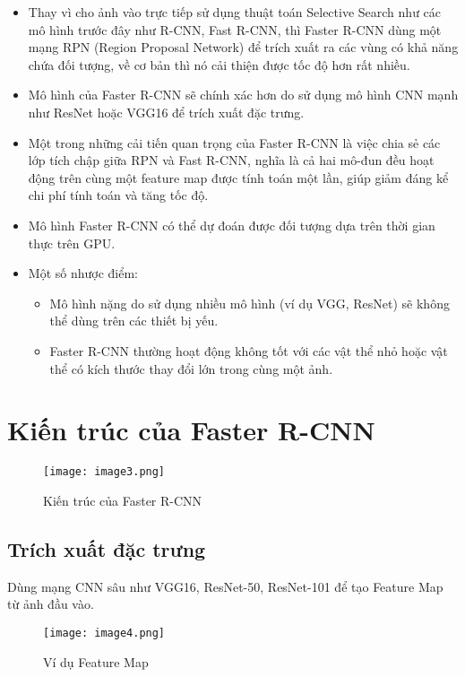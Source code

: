 \documentclass{article}
\begin{document}
\begin{itemize}
    \item Thay vì cho ảnh vào trực tiếp sử dụng thuật toán Selective Search như các mô hình trước đây như R-CNN, Fast R-CNN, thì Faster R-CNN dùng một mạng RPN (Region Proposal Network) để trích xuất ra các vùng có khả năng chứa đối tượng, về cơ bản thì nó cải thiện được tốc độ hơn rất nhiều.
    \item Mô hình của Faster R-CNN sẽ chính xác hơn do sử dụng mô hình CNN mạnh như ResNet hoặc VGG16 để trích xuất đặc trưng.
    \item Một trong những cải tiến quan trọng của Faster R-CNN là việc chia sẻ các lớp tích chập giữa RPN và Fast R-CNN, nghĩa là cả hai mô-đun đều hoạt động trên cùng một feature map được tính toán một lần, giúp giảm đáng kể chi phí tính toán và tăng tốc độ.
    \item Mô hình Faster R-CNN có thể dự đoán được đối tượng dựa trên thời gian thực trên GPU.
    \item Một số nhược điểm:
    \begin{itemize}
        \item Mô hình nặng do sử dụng nhiều mô hình (ví dụ VGG, ResNet) sẽ không thể dùng trên các thiết bị yếu.
        \item Faster R-CNN thường hoạt động không tốt với các vật thể nhỏ hoặc vật thể có kích thước thay đổi lớn trong cùng một ảnh.
    \end{itemize}
\end{itemize}

\section{Kiến trúc của Faster R-CNN}
\begin{figure}[H]
    \centering
    \texttt{[image: image3.png]}
    \caption{Kiến trúc của Faster R-CNN}
\end{figure}

\subsection{Trích xuất đặc trưng}
Dùng mạng CNN sâu như VGG16, ResNet-50, ResNet-101 để tạo Feature Map từ ảnh đầu vào.

\begin{figure}[H]
    \centering
    \texttt{[image: image4.png]}
    \caption{Ví dụ Feature Map}
\end{figure}
\end{document}
